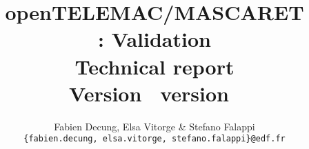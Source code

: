\title{\textbf{openTELEMAC/MASCARET \\
\estel : Validation \\
Technical report \\
Version  \ version~\rel}}
\author{Fabien Decung, Elsa Vitorge \& Stefano Falappi \\
   \texttt{\{fabien.decung, elsa.vitorge, stefano.falappi\}@edf.fr}}

\date{}
 
\maketitle

